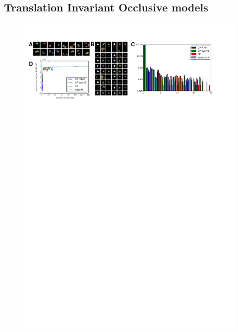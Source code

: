 
\subsection{Translation Invariant Occlusive models}

\begin{figure}[t]
\centering

\includegraphics[width=\textwidth]{figs/inveca/invec.pdf}


\end{figure}
